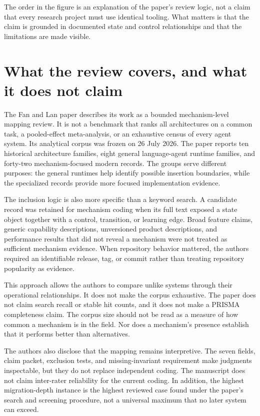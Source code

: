 The order in the figure is an explanation of the paper's review logic, not a claim that every research project must use identical tooling. What matters is that the claim is grounded in documented state and control relationships and that the limitations are made visible.

\section{What the review covers, and what it does not claim}
\label{sec:review-scope-limits}

The Fan and Lan paper describes its work as a bounded mechanism-level mapping review. It is not a benchmark that ranks all architectures on a common task, a pooled-effect meta-analysis, or an exhaustive census of every agent system. Its analytical corpus was frozen on 26 July 2026. The paper reports ten historical architecture families, eight general language-agent runtime families, and forty-two mechanism-focused modern records. The groups serve different purposes: the general runtimes help identify possible insertion boundaries, while the specialized records provide more focused implementation evidence.

The inclusion logic is also more specific than a keyword search. A candidate record was retained for mechanism coding when its full text exposed a state object together with a control, transition, or learning edge. Broad feature claims, generic capability descriptions, unversioned product descriptions, and performance results that did not reveal a mechanism were not treated as sufficient mechanism evidence. When repository behavior mattered, the authors required an identifiable release, tag, or commit rather than treating repository popularity as evidence.

This approach allows the authors to compare unlike systems through their operational relationships. It does not make the corpus exhaustive. The paper does not claim search recall or stable hit counts, and it does not make a PRISMA completeness claim. The corpus size should not be read as a measure of how common a mechanism is in the field. Nor does a mechanism's presence establish that it performs better than alternatives.

The authors also disclose that the mapping remains interpretive. The seven fields, claim packet, exclusion tests, and missing-invariant requirement make judgments inspectable, but they do not replace independent coding. The manuscript does not claim inter-rater reliability for the current coding. In addition, the highest migration-depth instance is the highest reviewed case found under the paper's search and screening procedure, not a universal maximum that no later system can exceed.


